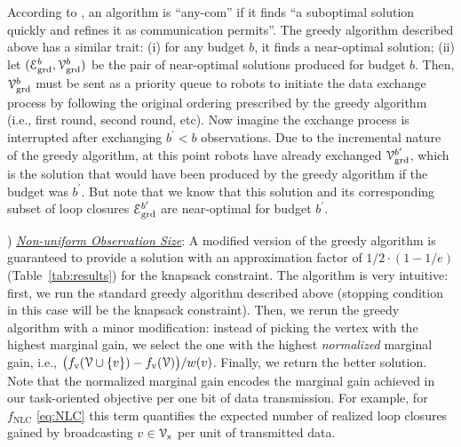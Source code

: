 \documentclass[conference]{IEEEtran}
\begin{document}
\begin{remark}
  \label{rem:anycomm} 
  According to \cite{otte2014any}, an algorithm is ``any-com'' if it finds ``a
  suboptimal solution quickly and refines it as communication permits''.
  The greedy algorithm described above has a similar trait:
  (i) for any budget $b$, it finds a near-optimal solution; (ii) let
  $(\mathcal{E}_\text{grd}^b,\mathcal{V}_\text{grd}^b)$ be the pair of near-optimal solutions produced for budget
  $b$. Then, $\mathcal{V}_\text{grd}^b$ must be sent as a priority queue to robots to
  initiate the data exchange process by following the original ordering prescribed by the greedy algorithm (i.e.,
  first round, second round, etc). Now imagine the exchange process is
  interrupted after exchanging $b^\prime < b$ observations.
  Due to the incremental nature of the greedy algorithm, at this point robots
  have already exchanged $\mathcal{V}_\text{grd}^{b^\prime}$, which is the solution that
  would have been produced by the greedy algorithm if the budget was
  $b^\prime$. But note that we know that this solution and its corresponding subset of loop closures
  $\mathcal{E}_\text{grd}^{b^\prime}$ are near-optimal for budget $b^\prime$. 
\end{remark}


) \underline{\it Non-uniform Observation Size}:
A modified version of the greedy algorithm is guaranteed
to provide a solution with an approximation factor of $1/2 \cdot (1-1/e)$
\cite{leskovec2007cost,krauseSurvey} (Table~\ref{tab:results}) for the knapsack
constraint. The algorithm is
very intuitive: first, we run the standard greedy algorithm
described above (stopping condition in this case will be the knapsack
constraint). Then, we rerun the greedy algorithm with a minor modification:
instead of picking the vertex with the highest marginal gain, we select the one
with the highest \emph{normalized} marginal gain,
i.e., $\big(f_\text{v}(\mathcal{V} \cup \{v\}) - f_\text{v}(\mathcal{V})\big)/{w(v)}$. Finally, we return the
better solution. Note that the normalized marginal gain 
encodes the marginal gain achieved in our task-oriented objective 
per one bit of data transmission. For example, for $f_\text{NLC}$ \eqref{eq:NLC} this term
quantifies the expected number of realized loop closures gained by broadcasting
$v \in \mathcal{V}_\mathsf{x}$ per unit of transmitted data.
\end{document}

